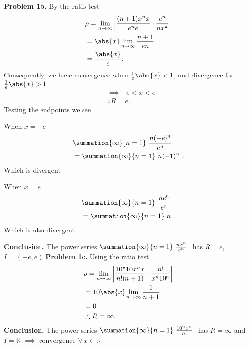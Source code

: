 \documentclass{report}
\begin{document}
    \pagebreak \bigbreak \noindent 
    \textbf{Problem 1b.} By the ratio test
    \begin{align*}
        &\rho = \lim\limits_{n \to \infty}{\bigg\lvert \frac{(n+1)x^{n}x}{e^{n}e} \cdot \frac{e^{n}}{nx^{n}} \bigg\rvert} \\
        &=\abs{x}\lim\limits_{n \to \infty}{\frac{n+1}{en}} \\
        &=\frac{\abs{x}}{e} 
    .\end{align*}
    \bigbreak \noindent 
        Consequently, we have convergence when $\frac{1}{e}\abs{x} < 1$, and divergence for $\frac{1}{e}\abs{x} > 1$
        \begin{align*}
            &\implies  -e < x < e \\
            &\therefore R = e 
        .\end{align*}
    \bigbreak \noindent 
    Testing the endpoints we see
    \bigbreak \noindent 
    \begin{minipage}[t]{0.4\textwidth}
        When $x=-e$
        \begin{align*}
            &\summation{\infty}{n=1}\ \frac{n(-e)^{n}}{e^{n}}\  \\
            &=\summation{\infty}{n=1}\ n(-1)^{n}\ 
        .\end{align*}
        \bigbreak \noindent 
        Which is divergent
    \end{minipage}
    \hspace{1in}
    \begin{minipage}[t]{0.47\textwidth}
        When $x=e$
        \begin{align*}
            &\summation{\infty}{n=1}\ \frac{ne^{n}}{e^{n}}\  \\
            &=\summation{\infty}{n=1}\ n\ 
        .\end{align*}
        Which is also divergent
    \end{minipage}
    \bigbreak \noindent 
    \textbf{Conclusion.} The power series $\summation{\infty}{n=1}\ \frac{nx^{n}}{e^{n}}\  $ has $R=e$, $I=(-e,e)$
    \bigbreak \noindent 
    \textbf{Problem 1c.} Using the ratio test
    \begin{align*}
        &\rho = \lim\limits_{n \to \infty}{\bigg\lvert \frac{10^{n}10x^{n}x}{n!(n+1)} \cdot \frac{n!}{x^{n}10^{n}} \bigg\rvert} \\
        &=10\abs{x} \lim\limits_{n \to \infty}{\frac{1}{n+1}} \\
        &=0 \\
        &\therefore R = \infty 
    .\end{align*}
    \bigbreak \noindent 
    \textbf{Conclusion.} The power series $\summation{\infty}{n=1}\ \frac{10^{n}x^{n}}{n!}\ $ has $R = \infty$ and $I=\mathbb{R}$ $\implies \text{ convergence } \forall\ x\in\mathbb{R}$
\end{document}
